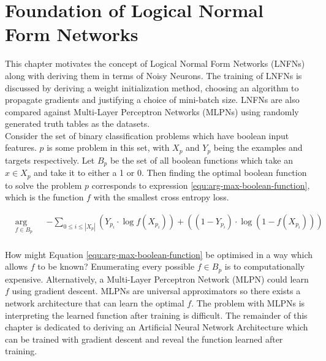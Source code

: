 \chapter{Foundation of Logical Normal Form Networks}\label{C:foundation-of-lnfns}
This chapter motivates the concept of Logical Normal Form Networks (LNFNs) along with deriving them in terms of Noisy Neurons. The training of LNFNs is discussed by deriving a weight initialization method, choosing an algorithm to propagate gradients and justifying a choice of mini-batch size. LNFNs are also compared against Multi-Layer Perceptron Networks (MLPNs) using randomly generated truth tables as the datasets.\\

Consider the set of binary classification problems which have boolean input features. $p$ is some problem in this set, with $X_p$ and $Y_p$ being the examples and targets respectively. Let $B_p$ be the set of all boolean functions which take an $x \in X_p$ and take it to either a 1 or 0. Then finding the optimal boolean function to solve the problem $p$ corresponds to expression \ref{equ:arg-max-boolean-function}, which is the function $f$ with the smallest cross entropy loss.

\begin{equation}
\label{equ:arg-max-boolean-function}
\begin{aligned}
& \underset{f \in B_p}{\text{arg min}}
& & -\sum_{0 \leq i \leq |X_p|} (Y_{p_i} \cdot \log f(X_{p_i})) + ((1 - Y_{p_i}) \cdot \log(1 - f(X_{p_i})))  \\
\end{aligned}
\end{equation}

How might Equation \ref{equ:arg-max-boolean-function} be optimised in a way which allows $f$ to be known? Enumerating every possible $f \in B_p$ is to computationally expensive. Alternatively, a Multi-Layer Perceptron Network (MLPN) could learn $f$ using gradient descent. MLPNs are universal approximators so there exists a network architecture that can learn the optimal $f$. The problem with MLPNs is interpreting the learned function after training is difficult. The remainder of this chapter is dedicated to deriving an Artificial Neural Network Architecture which can be trained with gradient descent and reveal the function learned after training.\\

